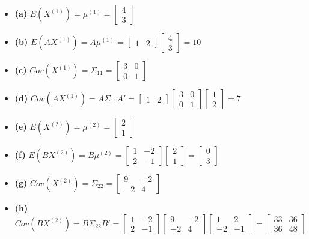 \documentclass[12pt]{article}
\begin{document}
\begin{itemize}
    \item \textbf{(a)} $E(X^{(1)}) = \mu^{(1)} = \begin{bmatrix} 4 \\ 3 \end{bmatrix}$ 
    \item \textbf{(b)} $E(AX^{(1)}) = A\mu^{(1)} = \begin{bmatrix} 1 & 2 \end{bmatrix} \begin{bmatrix} 4 \\ 3 \end{bmatrix} = 10$ 
    \item \textbf{(c)} $Cov(X^{(1)}) = \Sigma_{11} = \begin{bmatrix} 3 & 0 \\ 0 & 1 \end{bmatrix}$ 
    \item \textbf{(d)} $Cov(AX^{(1)}) = A\Sigma_{11}A' = \begin{bmatrix} 1 & 2 \end{bmatrix} \begin{bmatrix} 3 & 0 \\ 0 & 1 \end{bmatrix} \begin{bmatrix} 1 \\ 2 \end{bmatrix} = 7$ 
    \item \textbf{(e)} $E(X^{(2)}) = \mu^{(2)} = \begin{bmatrix} 2 \\ 1 \end{bmatrix}$ 
    \item \textbf{(f)} $E(BX^{(2)}) = B\mu^{(2)} = \begin{bmatrix} 1 & -2 \\ 2 & -1 \end{bmatrix} \begin{bmatrix} 2 \\ 1 \end{bmatrix} = \begin{bmatrix} 0 \\ 3 \end{bmatrix}$ 
    \item \textbf{(g)} $Cov(X^{(2)}) = \Sigma_{22} = \begin{bmatrix} 9 & -2 \\ -2 & 4 \end{bmatrix}$ 
    \item \textbf{(h)} $Cov(BX^{(2)}) = B\Sigma_{22}B' = \begin{bmatrix} 1 & -2 \\ 2 & -1 \end{bmatrix} \begin{bmatrix} 9 & -2 \\ -2 & 4 \end{bmatrix} \begin{bmatrix} 1 & 2 \\ -2 & -1 \end{bmatrix} = \begin{bmatrix} 33 & 36 \\ 36 & 48 \end{bmatrix}$ 

\end{itemize}
\end{document}
